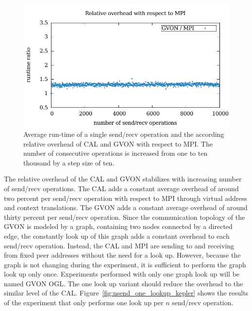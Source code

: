 \begin{figure}[H]
\begin{minipage}[t]{0.5\textwidth}
    \includegraphics[width=\textwidth]{plots/50_nsend_overhead_gvon}
  \end{minipage}%
  \caption{Average run-time of a single send/recv operation and the
    according relative overhead of CAL and GVON with respect to
    MPI. The number of consecutive operations is increased from one to
    ten thousand by a step size of ten. }
  \label{fig:nsend_kepler}
\end{figure}

\noindent The relative overhead of the CAL and GVON stabilizes with
increasing number of send/recv operations.  The CAL adds a constant
average overhead of around two percent per send/recv operation with
respect to MPI through virtual address and context translations. The
GVON adds a constant average overhead of around thirty percent per
send/recv operation.  Since the communication topology of the GVON is
modeled by a graph, containing two nodes connected by a directed edge,
the constantly look up of this graph adds a constant overhead to each
send/recv operation.  Instead, the CAL and MPI are sending to and
receiving from fixed peer addresses without the need for a look up.
However, because the graph is not changing during the experiment, it
is sufficient to perform the graph look up only once. Experiments
performed with only one graph look up will be named GVON OGL. The one
look up variant should reduce the overhead to the similar level of
the CAL. Figure~\ref{fig:nsend_one_lookup_kepler} shows the results of
the experiment that only performs one look up per $n$ send/recv
operation.

